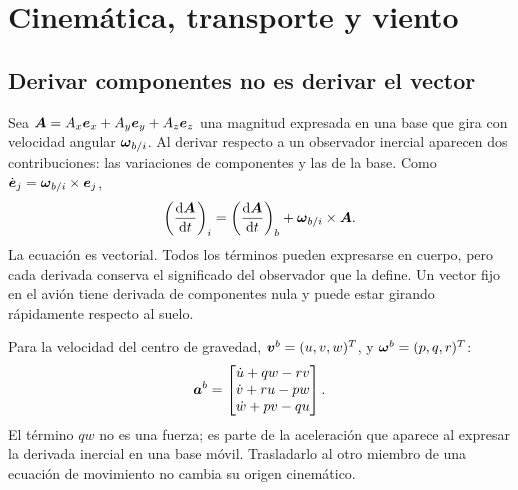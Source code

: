 \chapter{Cinemática, transporte y viento}\label{ch:cinematica}

\section{Derivar componentes no es derivar el vector}
Sea $\boldsymbol{A}=A_x\boldsymbol{e}_x+A_y\boldsymbol{e}_y+A_z\boldsymbol{e}_z$ una magnitud expresada en una base que gira con velocidad angular $\boldsymbol{\omega}_{b/i}$. Al derivar respecto a un observador inercial aparecen dos contribuciones: las variaciones de componentes y las de la base. Como $\dot{\boldsymbol{e}}_j=\boldsymbol{\omega}_{b/i}\times\boldsymbol{e}_j$,
\begin{equation}
\left(\frac{\mathrm{d}\boldsymbol{A}}{\mathrm{d} t}\right)_i
=\left(\frac{\mathrm{d}\boldsymbol{A}}{\mathrm{d} t}\right)_b+\boldsymbol{\omega}_{b/i}\times\boldsymbol{A}.
\label{eq:transporte}
\end{equation}
La ecuación es vectorial. Todos los términos pueden expresarse en cuerpo, pero cada derivada conserva el significado del observador que la define. Un vector fijo en el avión tiene derivada de componentes nula y puede estar girando rápidamente respecto al suelo.

Para la velocidad del centro de gravedad, $\boldsymbol{v}^b=(u,v,w)^T$, y $\boldsymbol{\omega}^b=(p,q,r)^T$:
\begin{equation}
\boldsymbol{a}^b=\begin{bmatrix}\dot u+qw-rv\\\dot v+ru-pw\\\dot w+pv-qu\end{bmatrix}.
\label{eq:aceleracion-cuerpo}
\end{equation}
El término $qw$ no es una fuerza; es parte de la aceleración que aparece al expresar la derivada inercial en una base móvil. Trasladarlo al otro miembro de una ecuación de movimiento no cambia su origen cinemático.


